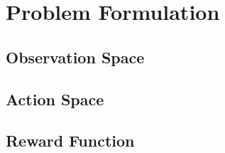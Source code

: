 \chapter{Problem Formulation}\label{ch:problem_formulation}





\section{Observation Space}




\section{Action Space}









\section{Reward Function}

